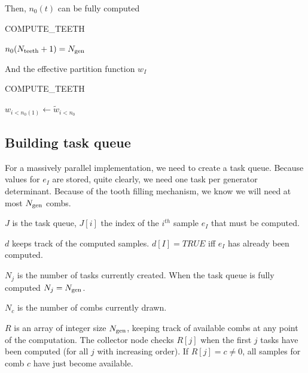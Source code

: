 \documentclass[./thesis.tex]{subfiles}
\newcommand{\Nteeth}{N_\text{teeth}}
\begin{document}
Then, $n_0(t)$ can be fully computed

\begin{algorithm}
	\caption{COMPUTE\_TEETH}
	$n_0(\Nteeth+1) = \Ngen$ \;
\end{algorithm}


And the effective partition function $w_I$

\begin{algorithm}
	\caption{COMPUTE\_TEETH}
	$w_{i<n_0(1)} \gets \tilde w_{i<n_0}$ \;
	
\end{algorithm}



\subsection{Building task queue}

For a massively parallel implementation, we need to create a task queue. Because values for $e_I$ are stored, quite clearly, we need one task per generator determinant. Because of the tooth filling mechanism, we know we will need at most ${N_\text{gen}}$ combs.
\begin{description}
\item{$J$} is the task queue, $J[i]$ the index of the $i^{th}$ sample $e_I$ that must be computed.
\item{$d$} keeps track of the computed samples. $d[I] = TRUE$ iff $e_I$ has already been computed.
\item{$N_j$} is the number of tasks currently created. When the task queue is fully computed $N_j = {N_\text{gen}}$.
\item{$N_c$} is the number of combs currently drawn.
\item{$R$} is an array of integer size ${N_\text{gen}}$, keeping track of available combs at any point of the computation. The collector node checks $R[j]$ when the first $j$ tasks have been computed (for all $j$ with increasing order). If $R[j] = c \neq 0$, all samples for comb $c$ have just become available. 
\end{description}
\end{document}
